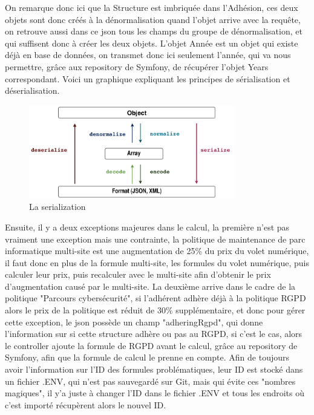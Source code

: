 \documentclass[a4paper,12pt]{report}
\begin{document}
On remarque donc ici que la Structure est imbriquée dans l'Adhésion, ces deux objets sont donc créés à la dénormalisation quand l'objet arrive avec la requête, on retrouve aussi dans ce json tous les champs du groupe de dénormalisation, et qui suffisent donc à créer les deux objets. L'objet Année est un objet qui existe déjà en base de données, on transmet donc ici seulement l'année, qui va nous permettre, grâce aux repository de Symfony, de récupérer l'objet Years correspondant. Voici un graphique expliquant les principes de sérialisation et déserialisation.

\begin{figure}[h]
    \centering
    \includegraphics[width=0.8\textwidth]{SerializerWorkflow.png}
    \caption{La serialization}
    \label{fig:serialization}
\end{figure}

Ensuite, il y a deux exceptions majeures dans le calcul, la première n'est pas vraiment une exception mais une contrainte, la politique de maintenance de parc informatique multi-site est une augmentation de 25\% du prix du volet numérique, il faut donc en plus de la formule multi-site, les formules du volet numérique, puis calculer leur prix, puis recalculer avec le multi-site afin d'obtenir le prix d'augmentation causé par le multi-site. La deuxième arrive dans le cadre de la politique "Parcours cybersécurité", si l'adhérent adhère déjà à la politique RGPD alors le prix de la politique est réduit de 30\% supplémentaire, et donc pour gérer cette exception, le json possède un champ "adheringRgpd", qui donne l'information sur si cette structure adhère ou pas au RGPD, si c'est le cas, alors le controller ajoute la formule de RGPD avant le calcul, grâce au repository de Symfony, afin que la formule de calcul le prenne en compte. Afin de toujours avoir l'information sur l'ID des formules problématiques, leur ID est stocké dans un fichier .ENV, qui n'est pas sauvegardé sur Git, mais qui évite ces "nombres magiques", il y'a juste à changer l'ID dans le fichier .ENV et tous les endroits où c'est importé récupèrent alors le nouvel ID.
\end{document}
